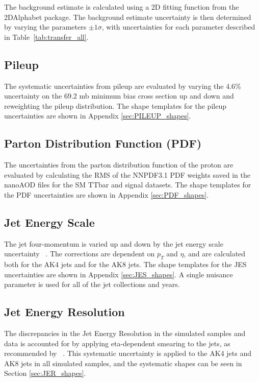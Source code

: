The background estimate is calculated using a 2D fitting function from the 2DAlphabet package. The background estimate uncertainty is then determined by varying the parameters $\pm 1 \sigma$, with uncertainties for each parameter described in Table~\ref{tab:transfer_all}.

\subsection{Pileup} \label{sectionPUunc}

The systematic uncertainties from pileup are evaluated by varying the 4.6\% uncertainty on the $69.2$ mb minimum bias cross section up and down and reweighting the pileup distribution. The shape templates for the pileup uncertainties are shown in Appendix \ref{sec:PILEUP_shapes}.

\subsection{Parton Distribution Function (PDF)} \label{sectionPDFunc}

The uncertainties from the parton distribution function of the proton are evaluated by calculating the RMS of the NNPDF3.1 PDF weights saved in the nanoAOD files for the SM TTbar and signal datasets. The shape templates for the PDF uncertainties are shown in Appendix \ref{sec:PDF_shapes}.

\subsection{Jet Energy Scale}

The jet four-momentum is varied up and down by the jet energy scale uncertainty ~\cite{CMS:JER}. The corrections are dependent on  $p_T$ and $\eta$, and are calculated both for the AK4 jets and for the AK8 jets. The shape templates for the JES uncertainties are shown in Appendix \ref{sec:JES_shapes}. A single nuisance parameter is used for all of the jet collections and years. 

\subsection{Jet Energy Resolution}

The discrepancies in the Jet Energy Resolution in the simulated samples and data is accounted for by applying eta-dependent smearing to the jets, as recommended by ~\cite{CMS:JER}. This systematic uncertainty is applied to the AK4 jets and AK8 jets in all simulated samples, and the systematic shapes can be seen in Section \ref{sec:JER_shapes}. 



